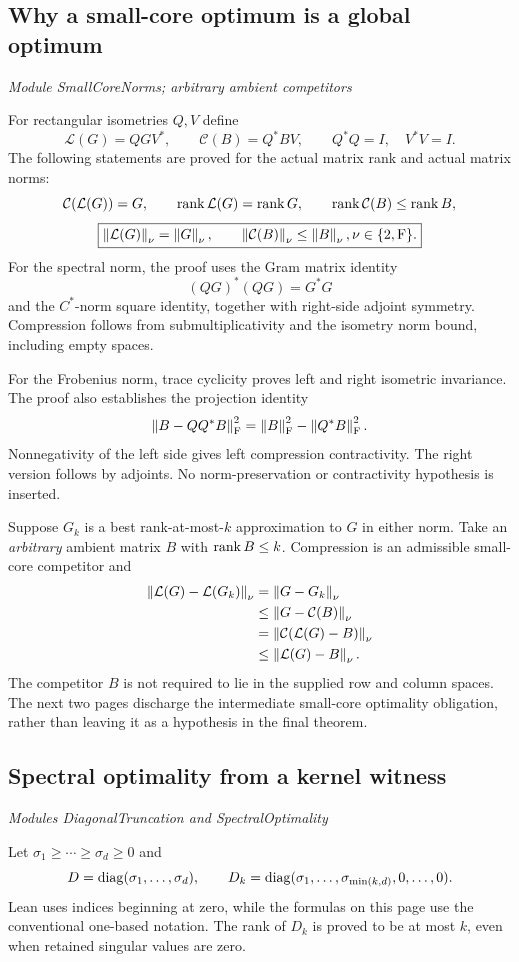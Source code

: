 \subsection{Why a small-core optimum is a global optimum}\label{supp6:subsection:002}\textit{Module SmallCoreNorms; arbitrary ambient competitors}\par
For rectangular isometries $Q,V$ define
\[
\mathcal L(G)=QGV^*,\qquad \mathcal C(B)=Q^*BV,
\qquad Q^*Q=I,\quad V^*V=I.
\]
The following statements are proved for the actual matrix rank and actual matrix norms:
\[
\mathcal C(\mathcal L(G))=G,
\qquad \rank\mathcal L(G)=\rank G,
\qquad \rank\mathcal C(B)\leq\rank B,
\]
\[
\boxed{\norm{\mathcal L(G)}_\nu=\norm{G}_\nu,
\qquad \norm{\mathcal C(B)}_\nu\leq\norm B_\nu,
\quad \nu\in\{2,\mathrm F\}.}
\]
For the spectral norm, the proof uses the Gram matrix identity
\[
(QG)^*(QG)=G^*G
\]
and the $C^*$-norm square identity, together with right-side adjoint symmetry. Compression follows from submultiplicativity and the isometry norm bound, including empty spaces.

For the Frobenius norm, trace cyclicity proves left and right isometric invariance. The proof also establishes the projection identity
\[
\norm{B-QQ^*B}_{\mathrm F}^{2}
=\norm B_{\mathrm F}^{2}-\norm{Q^*B}_{\mathrm F}^{2}.
\]
Nonnegativity of the left side gives left compression contractivity. The right version follows by adjoints. No norm-preservation or contractivity hypothesis is inserted.

Suppose $G_k$ is a best rank-at-most-$k$ approximation to $G$ in either norm. Take an \emph{arbitrary} ambient matrix $B$ with $\operatorname{rank} B\leq k$. Compression is an admissible small-core competitor and
\[
\begin{aligned}
\norm{\mathcal L(G)-\mathcal L(G_k)}_\nu
&=\norm{G-G_k}_\nu\\
&\leq\norm{G-\mathcal C(B)}_\nu\\
&=\norm{\mathcal C(\mathcal L(G)-B)}_\nu\\
&\leq\norm{\mathcal L(G)-B}_\nu.
\end{aligned}
\]
The competitor $B$ is not required to lie in the supplied row and column spaces. The next two pages discharge the intermediate small-core optimality obligation, rather than leaving it as a hypothesis in the final theorem.



\subsection{Spectral optimality from a kernel witness}\label{supp6:subsection:003}\textit{Modules DiagonalTruncation and SpectralOptimality}\par
Let $\sigma_1\geq\cdots\geq\sigma_d\geq0$ and
\[
D=\operatorname{diag}(\sigma_1,\ldots,\sigma_d),\qquad
D_k=\operatorname{diag}(\sigma_1,\ldots,\sigma_{\min(k,d)},0,\ldots,0).
\]
Lean uses indices beginning at zero, while the formulas on this page use the conventional one-based notation. The rank of $D_k$ is proved to be at most $k$, even when retained singular values are zero.

